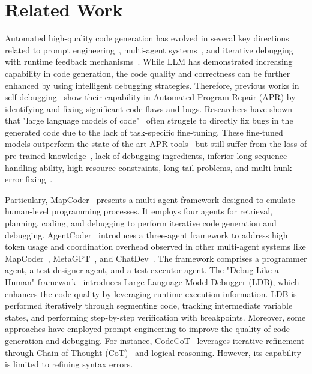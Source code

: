 \section{Related Work}
\label{lit}
Automated high-quality code generation has evolved in several key directions related to prompt engineering~\cite{ai_literacy_p_e, Wei2022ChainOT}, multi-agent systems~\cite{wooldridge1995intelligent, approach_to_ai_agents}, and iterative debugging with runtime feedback mechanisms~\cite{generative_agents, chen2023teachinglargelanguagemodels, islam2024mapcodermultiagentcodegeneration, huang2024agentcodermultiagentbasedcodegeneration, software_testing}.
While LLM has demonstrated increasing capability in code generation, the code quality and correctness can be further enhanced by using intelligent debugging strategies.
Therefore, previous works in self-debugging~\cite{Huang2023AnES, chen2023teachinglargelanguagemodels} show their capability in Automated Program Repair (APR) by identifying and fixing significant code flaws and bugs.
Researchers have shown that "large language models of code"~\cite{Huang2023AnES} often struggle to directly fix bugs in the generated code due to the lack of task-specific fine-tuning. 
These fine-tuned models outperform the state-of-the-art APR tools~\cite{lesstraining, vulrepair, repairisnearly} but still suffer from the loss of pre-trained knowledge~\cite{Xia2022LessTM, adnan2024unleashingartificialcognitionintegrating}, lack of debugging ingredients, inferior long-sequence handling ability, high resource constraints, long-tail problems, and multi-hunk error fixing~\cite{Huang2023AnES}.

Particulary, MapCoder~\cite{islam2024mapcodermultiagentcodegeneration} presents a multi-agent framework designed to emulate human-level programming processes. 
It employs four agents for retrieval, planning, coding, and debugging to perform iterative code generation and debugging.
AgentCoder~\cite{huang2024agentcodermultiagentbasedcodegeneration} introduces a three-agent framework to address high token usage and coordination overhead observed in other multi-agent systems like MapCoder~\cite{islam2024mapcodermultiagentcodegeneration}, MetaGPT~\cite{hong2024metagptmetaprogrammingmultiagent}, and ChatDev~\cite{qian2024chatdevcommunicativeagentssoftware}.
The framework comprises a programmer agent, a test designer agent, and a test executor agent.
The "Debug Like a Human" framework~\cite{zhong2024debuglikehumanlarge} introduces Large Language Model Debugger (LDB), which enhances the code quality by leveraging runtime execution information. 
LDB is performed iteratively through segmenting code, tracking intermediate variable states, and performing step-by-step verification with breakpoints.
Moreover, some approaches have employed prompt engineering to improve the quality of code generation and debugging.
For instance,  CodeCoT~\cite{huang2024codecottacklingcodesyntax} leverages iterative refinement through Chain of Thought (CoT)~\cite{Wei2022ChainOT} and logical reasoning. 
However, its capability is limited to refining syntax errors.

